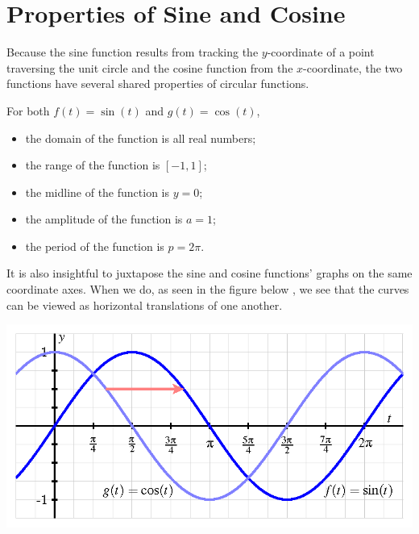 \documentclass[nooutcomes]{ximera}
\begin{document}
\begin{center}  
\end{center} 


\section{Properties of Sine and Cosine}
Because the sine function results from tracking the \(y\)-coordinate of a point traversing the unit circle and the cosine function from the \(x\)-coordinate, the two functions have several shared properties of circular functions.

\begin{callout}
For both \(f(t) = \sin(t)\) and \(g(t) = \cos(t)\),%
\begin{itemize}[label=\textbullet]
\item
the domain of the function is all real numbers;%
\item
the range of the function is \([-1,1]\);%
\item
the midline of the function is \(y = 0\);%
\item
the amplitude of the function is \(a = 1\);%
\item
the period of the function is \(p = 2\pi\).%
\end{itemize}
\end{callout}

It is also insightful to juxtapose the sine and cosine functions' graphs on the same coordinate axes.  When we do, as seen in the figure below%
, we see that the curves can be viewed as horizontal translations of one another.%

\begin{image}
\includegraphics{sine-and-cosine-graphs.png}
\end{image}
\end{document}

